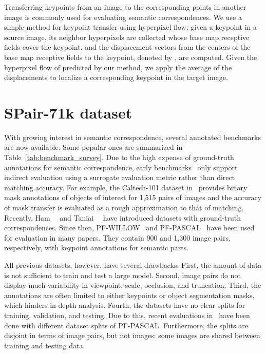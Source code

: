 \documentclass[10pt,twocolumn,letterpaper]{article}
\begin{document}
Transferring keypoints from an image to the corresponding points in another image is commonly used for evaluating semantic correspondences.  
We use a simple method for keypoint transfer using hyperpixel flow; 
given a keypoint  in a source image, its neighbor hyperpixels  are collected whose base map receptive fields cover the keypoint, and the displacement vectors from the centers of the base map receptive fields to the keypoint, denoted by , are computed. Given the hyperpixel flow  of  predicted by our method, we apply the average of the displacements  to localize a corresponding keypoint in the target image.




 





\section{SPair-71k dataset}
With growing interest in semantic correspondence, several annotated benchmarks are now available. 
Some popular ones are summarized in Table~\ref{tab:benchmark_survey}.  
Due to the high expense of ground-truth annotations for semantic correspondence, early benchmarks~\cite{chen_cvpr14, kim2013deformable} only support indirect evaluation using a surrogate evaluation metric rather than direct matching accuracy.    
For example, the Caltech-101 dataset in~\cite{kim2013deformable} provides binary mask annotations of objects of interest for 1,515 pairs of images and the accuracy of mask transfer is evaluated as a rough approximation to that of matching. 
Recently, Ham~\etal~\cite{ham2016proposal,ham2018proposal} and Taniai~\etal~\cite{taniai2016joint} have introduced datasets with ground-truth correspondences. Since then, PF-WILLOW~\cite{ham2016proposal} and PF-PASCAL~\cite{ham2018proposal} have been used for evaluation in many papers. They contain 900 and 1,300 image pairs, respectively, with keypoint annotations for semantic parts. 


All previous datasets, however, have several drawbacks: 
First, the amount of data is not sufficient to train and test a large model. Second, image pairs do not display much variability in viewpoint, scale, occlusion, and truncation. 
Third, the annotations are often limited to either keypoints or object segmentation masks, which hinders in-depth analysis.
Fourth, the datasets have no clear splits for training, validation, and testing. Due to this, recent evaluations in~\cite{han2017scnet, Rocco18, rocco2018neighbourhood} have been done with different dataset splits of PF-PASCAL. Furthermore, the splits are disjoint in terms of image pairs, but not images: some images are shared between training and testing data. 
\end{document}
